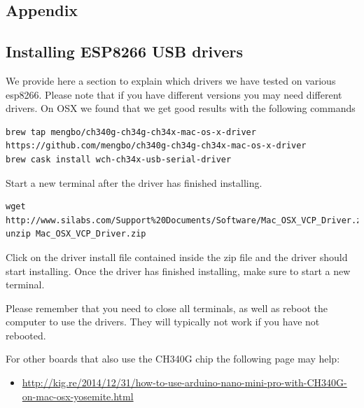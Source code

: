 \subsection{Appendix}\label{appendix}

\subsection{Installing ESP8266 USB
drivers}\label{installing-esp8266-usb-drivers}

We provide here a section to explain which drivers we have tested on
various esp8266. Please note that if you have different versions you may
need different drivers. On OSX we found that we get good results with
the following commands

\begin{verbatim}
brew tap mengbo/ch340g-ch34g-ch34x-mac-os-x-driver https://github.com/mengbo/ch340g-ch34g-ch34x-mac-os-x-driver
brew cask install wch-ch34x-usb-serial-driver
\end{verbatim}

Start a new terminal after the driver has finished installing.

\begin{verbatim}
wget http://www.silabs.com/Support%20Documents/Software/Mac_OSX_VCP_Driver.zip
unzip Mac_OSX_VCP_Driver.zip
\end{verbatim}

Click on the driver install file contained inside the zip file and the
driver should start installing. Once the driver has finished installing,
make sure to start a new terminal.

Please remember that you need to close all terminals, as well as reboot
the computer to use the drivers. They will typically not work if you
have not rebooted.

For other boards that also use the CH340G chip the following page may
help:

\begin{itemize}
\item
  \url{http://kig.re/2014/12/31/how-to-use-arduino-nano-mini-pro-with-CH340G-on-mac-osx-yosemite.html}
\end{itemize}
